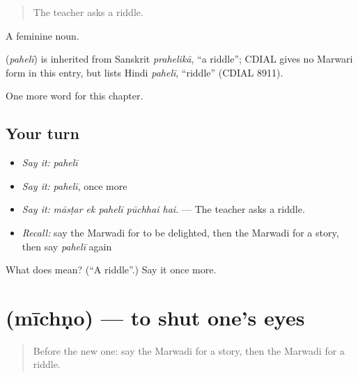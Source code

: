 \begin{quote}
The teacher asks a riddle.
\end{quote}

A feminine noun.

\begin{cousinweb}
\textbf{} (\emph{pahelī}) is inherited from Sanskrit \emph{prahelikā}, \textquotedblleft{}a riddle\textquotedblright{}; CDIAL gives no Marwari form in this entry, but lists Hindi \emph{pahelī}, \textquotedblleft{}riddle\textquotedblright{} (CDIAL 8911).
\end{cousinweb}

\begin{grammarlens}[title={What you've built}]
One more word for this chapter.
\end{grammarlens}

\subsection*{Your turn}
\begin{itemize}
\raggedright
  \item \emph{Say it:} \emph{pahelī}
  \item \emph{Say it:} \emph{pahelī}, once more
  \item \emph{Say it:} \emph{māsṭar ek pahelī pūchhai hai.} — The teacher asks a riddle.
  \item \emph{Recall:} say the Marwadi for to be delighted, then the Marwadi for a story, then say \emph{pahelī} again
\end{itemize}

\begin{tcolorbox}[breakable,colback=teal!4,colframe=teal!35!black,title={Before you move on}]
What does  mean? (\textquotedblleft{}A riddle\textquotedblright{}.) Say it once more.
\end{tcolorbox}
\section[\texorpdfstring{\mw{मीचणो} (mīchṇo)}{मीचणो (mīchṇo)}]{ (mīchṇo) — to shut one's eyes}

\label{lesson:MW-C278-michno}



\begin{quote}
Before the new one: say the Marwadi for a story, then the Marwadi for a riddle.
\end{quote}

